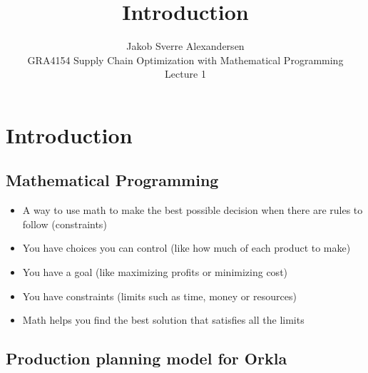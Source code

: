 \documentclass[10pt]{article}
\begin{document}
 
\title{Introduction}
\author{Jakob Sverre Alexandersen\\
GRA4154 Supply Chain Optimization with Mathematical Programming\\
Lecture 1}
\maketitle

\tableofcontents
\newpage


\section{Introduction}
\subsection{Mathematical Programming}
\begin{itemize}
    \item A way to use math to make the best possible decision when there are rules to follow (constraints)
    \item You have choices you can control (like how much of each product to make)
    \item You have a goal (like maximizing profits or minimizing cost)
    \item You have constraints (limits such as time, money or resources)
    \item Math helps you find the best solution that satisfies all the limits 
\end{itemize}
\subsection{Production planning model for Orkla}
\end{document}
